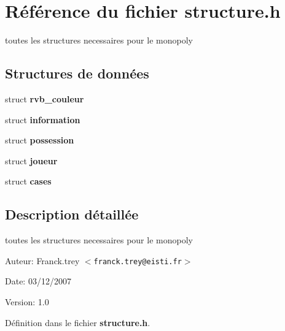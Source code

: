 \section{R\'{e}f\'{e}rence du fichier structure.h}
\label{structure_8h}
toutes les structures necessaires pour le monopoly 

\subsection*{Structures de donn\'{e}es}
\begin{CompactItemize}
\item 
struct {\bf rvb\_\-couleur}
\item 
struct {\bf information}
\item 
struct {\bf possession}
\item 
struct {\bf joueur}
\item 
struct {\bf cases}
\end{CompactItemize}


\subsection{Description d\'{e}taill\'{e}e}
toutes les structures necessaires pour le monopoly 

\begin{Desc}
\item[Auteur:]Franck.trey $<${\tt franck.trey@eisti.fr}$>$ \end{Desc}
\begin{Desc}
\item[Date:]03/12/2007 \end{Desc}
\begin{Desc}
\item[Version:]1.0 \end{Desc}


D\'{e}finition dans le fichier {\bf structure.h}.